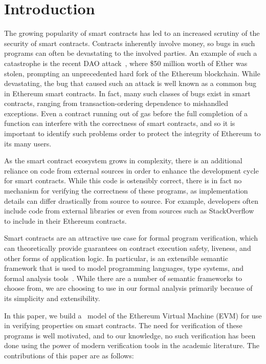 \section{Introduction}
The growing popularity of smart contracts has led to an increased scrutiny of
the security of smart contracts. Contracts inherently involve money, so bugs in
such programs can often be devastating to the involved parties. An example of
such a catastrophe is the recent DAO attack~\cite{dao-attack}, where \$50
million worth of Ether was stolen, prompting an unprecedented hard fork of the
Ethereum blockchain. While devastating, the bug that caused such an attack is
well known as a common bug in Ethereum smart contracts. In fact, many such
classes of bugs exist in smart contracts, ranging from transaction-ordering
dependence to mishandled exceptions. Even a contract running out of gas before
the full completion of a function can interfere with the correctness of smart
contracts, and so it is important to identify such problems order to protect the integrity of Ethereum to its many users.

As the smart contract ecosystem grows in complexity, there is an additional
reliance on code from external sources in order to enhance the development cycle
for smart contracts. While this code is ostensibly correct, there is in fact no
mechanism for verifying the correctness of these programs, as implementation
details can differ drastically from source to source. For example,
developers often include code from external libraries or even from sources such as
StackOverflow to include in their Ethereum contracts.

Smart contracts are an attractive use case for formal program verification, which
can theoretically provide guarantees on contract execution safety,
liveness, and other forms of application logic. In particular, \K{} is an
extensible semantic framework that is used to model programming languages, type
systems, and formal analysis tools~\cite{rosu-serbanuta-2010-jlap}. While there
are a number of semantic frameworks to choose from, we are choosing to use \K{} in
our formal analysis primarily because of its simplicity and extensibility.

In this paper, we build a \K{}~model of the Ethereum Virtual Machine (EVM) for use
in verifying properties on smart contracts. The need for verification of these
programs is well motivated, and to our knowledge, no such verification has been
done using the power of modern verification tools in the academic literature.
The contributions of this paper are as follows:


